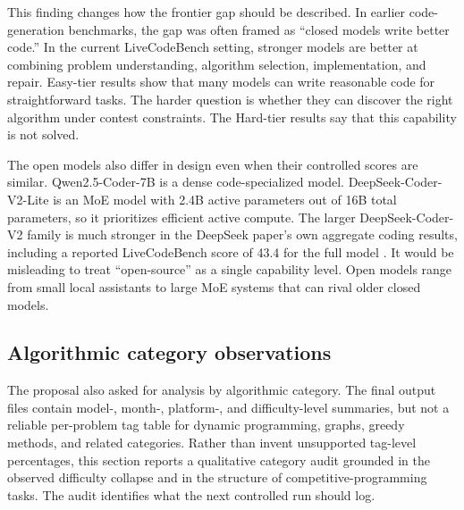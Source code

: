 \documentclass[11pt]{article}
\newcommand{\lcb}{LiveCodeBench}
\begin{document}
This finding changes how the frontier gap should be described. In earlier code-generation benchmarks, the gap was often framed as ``closed models write better code.'' In the current \lcb{} setting, stronger models are better at combining problem understanding, algorithm selection, implementation, and repair. Easy-tier results show that many models can write reasonable code for straightforward tasks. The harder question is whether they can discover the right algorithm under contest constraints. The Hard-tier results say that this capability is not solved.

The open models also differ in design even when their controlled scores are similar. Qwen2.5-Coder-7B is a dense code-specialized model. DeepSeek-Coder-V2-Lite is an MoE model with 2.4B active parameters out of 16B total parameters, so it prioritizes efficient active compute. The larger DeepSeek-Coder-V2 family is much stronger in the DeepSeek paper's own aggregate coding results, including a reported \lcb{} score of 43.4 for the full model \citep{zhu2024deepseekcoder}. It would be misleading to treat ``open-source'' as a single capability level. Open models range from small local assistants to large MoE systems that can rival older closed models.



\subsection{Algorithmic category observations}
The proposal also asked for analysis by algorithmic category. The final output files contain model-, month-, platform-, and difficulty-level summaries, but not a reliable per-problem tag table for dynamic programming, graphs, greedy methods, and related categories. Rather than invent unsupported tag-level percentages, this section reports a qualitative category audit grounded in the observed difficulty collapse and in the structure of competitive-programming tasks. The audit identifies what the next controlled run should log.
\end{document}
